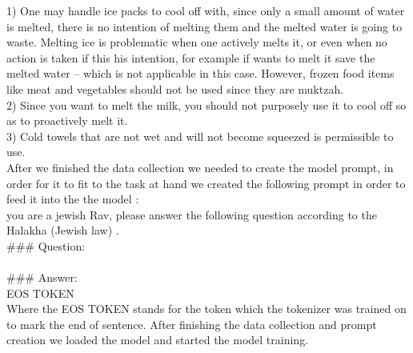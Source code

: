 \documentclass[11pt]{article}
\begin{document}
1) One may handle ice packs to cool off with, since only a small amount of water is melted, there is no intention of melting them and the melted water is going to waste. Melting ice is problematic when one actively melts it, or even when no action is taken if this his intention, for example if wants to melt it save the melted water – which is not applicable in this case.
However, frozen food items like meat and vegetables should not be used since they are muktzah.\\
2) Since you want to melt the milk, you should not purposely use it to cool off so as to proactively melt it.\\
3) Cold towels that are not wet and will not become squeezed is permissible to use.\\
After we finished the data collection we needed to create the model prompt, in order for it to fit to the task at hand we created the following prompt in order to feed it into the the model : \\
you are a jewish Rav, please answer the following question according to the Halakha (Jewish law) .\\
\#\#\# Question:\\
\\
\#\#\# Answer:\\
{} EOS TOKEN\\
Where the EOS TOKEN stands for the token which the tokenizer was trained on to mark the end of sentence.
After finishing the data collection and prompt creation we loaded the model and started the model training.
\end{document}
